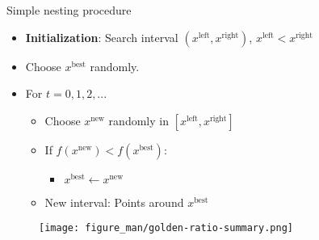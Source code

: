 \documentclass[11pt,compress,t,notes=noshow, xcolor=table]{beamer}
\begin{document}
\begin{vbframe}{Simple nesting procedure}

\begin{itemize}
\item\textbf{Initialization}: Search interval  $(x^{\text{left}}, x^{\text{right}})$, $x^{\text{left}} < x^{\text{right}}$
\item Choose $x^{\text{best}}$ randomly.
\item For $t = 0, 1, 2, ...$
\begin{itemize}
    \item Choose $x^{\text{new}}$ randomly in $[x^{\text{left}}, x^{\text{right}}]$
    \item If $f(x^{\text{new}}) < f(x^{\text{best}})$:
    \begin{itemize}
        \item $x^{\text{best}} \leftarrow x^{\text{new}}$
    \end{itemize}
    \item New interval: Points around $x^{\text{best}}$
\end{itemize}
\end{itemize}

\begin{figure}
    \centering
    \texttt{[image: figure\_man/golden-ratio-summary.png]}  
\end{figure}

\end{vbframe}
\end{document}
